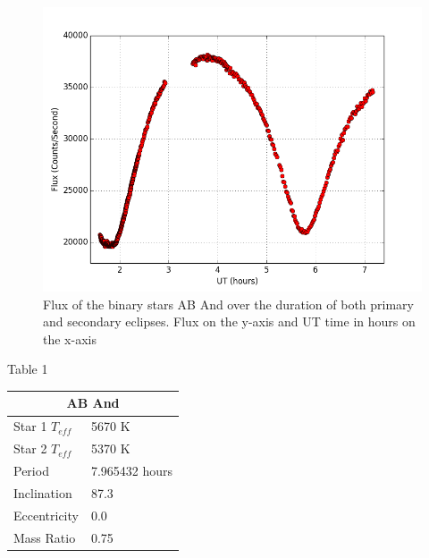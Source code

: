 \documentclass[12pt,twocolumn]{article}
\begin{document}
\begin{center}
\begin{figure}
\includegraphics[scale=0.35]{detrend_1}
\caption{\small{Flux of the binary stars AB And over the duration of both primary and secondary eclipses. Flux on the y-axis and UT time in hours on the x-axis}}
\end{figure}
\end{center}

\begin{center}
Table 1
\end{center}
\begin{center}
\begin{tabular}{|l|l|}
\hline
\multicolumn{2}{|c|}{AB And} \\
\hline
Star 1 $T_{eff}$  & 5670 K  \\
Star 2 $T_{eff}$  & 5370 K  \\
Period & 7.965432 hours \\
Inclination & 87.3 \\
Eccentricity & 0.0 \\
Mass Ratio & 0.75 \\
\hline
\end{tabular}
\end{center}
\end{document}

